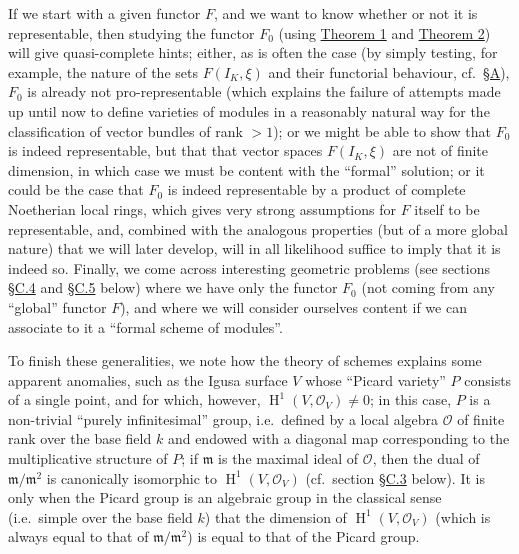 \documentclass{article}
\theoremstyle{definition}
\theoremstyle{definition}
\theoremstyle{definition}
\theoremstyle{definition}
\theoremstyle{remark}
\begin{document}
If we start with a given functor \(F\), and we want to know whether or not it is representable, then studying the functor \(F_0\) (using \protect\hyperlink{fga-3-ii-section-B-theorem-1}{Theorem 1} and \protect\hyperlink{fga-3-ii-section-B-theorem-2}{Theorem 2}) will give quasi-complete hints;
either, as is often the case (by simply testing, for example, the nature of the sets \(F(I_K,\xi)\) and their functorial behaviour, cf.~\protect\hyperlink{fga-3-ii-section-A}{§A}), \(F_0\) is already not pro-representable (which explains the failure of attempts made up until now to define varieties of modules in a reasonably natural way for the classification of vector bundles of rank \(>1\));
or we might be able to show that \(F_0\) is indeed representable, but that that vector spaces \(F(I_K,\xi)\) are not of finite dimension, in which case we must be content with the ``formal'' solution;
or it could be the case that \(F_0\) is indeed representable by a product of complete Noetherian local rings, which gives very strong assumptions for \(F\) itself to be representable, and, combined with the analogous properties (but of a more global nature) that we will later develop, will in all likelihood suffice to imply that it is indeed so.
Finally, we come across interesting geometric problems (see sections \protect\hyperlink{fga-3-ii-section-C.4}{§C.4} and \protect\hyperlink{fga-3-ii-section-C.5}{§C.5} below) where we have only the functor \(F_0\) (not coming from any ``global'' functor \(F\)), and where we will consider ourselves content if we can associate to it a ``formal scheme of modules''.

To finish these generalities, we note how the theory of schemes explains some apparent anomalies, such as the Igusa surface \(V\) whose ``Picard variety'' \(P\) consists of a single point, and for which, however, \(\operatorname{H}^1(V,{\mathscr{O}}_V)\neq0\);
in this case, \(P\) is a non-trivial ``purely infinitesimal'' group, i.e.~defined by a local algebra \({\mathscr{O}}\) of finite rank over the base field \(k\) and endowed with a diagonal map corresponding to the multiplicative structure of \(P\);
if \({\mathfrak{m}}\) is the maximal ideal of \({\mathscr{O}}\), then the dual of \({\mathfrak{m}}/{\mathfrak{m}}^2\) is canonically isomorphic to \(\operatorname{H}^1(V,{\mathscr{O}}_V)\) (cf.~section \protect\hyperlink{fga-3-ii-section-C.3}{§C.3} below).
It is only when the Picard group is an algebraic group in the classical sense (i.e.~simple over the base field \(k\)) that the dimension of \(\operatorname{H}^1(V,{\mathscr{O}}_V)\) (which is always equal to that of \({\mathfrak{m}}/{\mathfrak{m}}^2\)) is equal to that of the Picard group.
\end{document}
